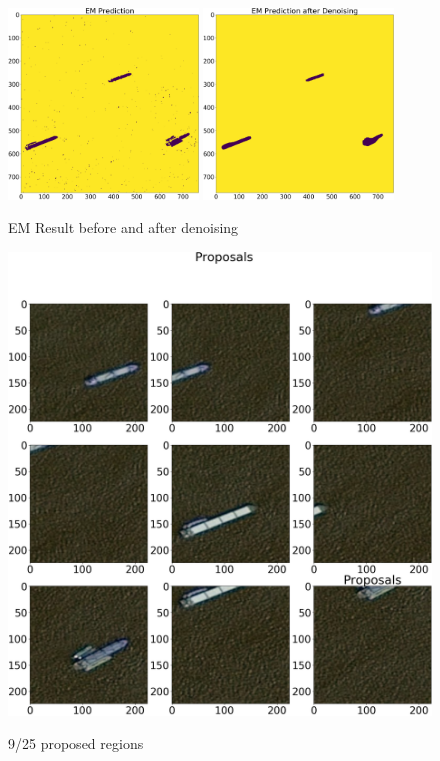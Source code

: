 \begin{figure}[h] 
	\centering
	\includegraphics[width=0.45\textwidth]{Pictures/011EMPred.png}
	\includegraphics[width=0.45\textwidth]{Pictures/011Denoising.png}
	\caption{EM Result before and after denoising}
	\label{em_pic}
\end{figure}
\begin{figure}[h]
	\centering
	\includegraphics[height=0.6\textheight]{Pictures/011Proposals.png}\\
	\caption{9/25 proposed regions}
	\label{propose_pic}
\end{figure}
